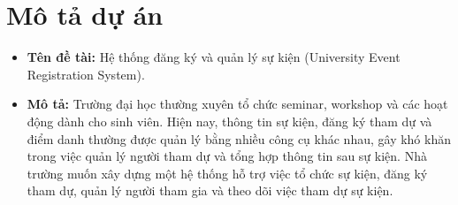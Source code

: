 \section*{Mô tả dự án}

\begin{itemize}
    \item \textbf{Tên đề tài:} Hệ thống đăng ký và quản lý sự kiện (University Event Registration System).
    \item \textbf{Mô tả:} Trường đại học thường xuyên tổ chức seminar, workshop và các hoạt động dành cho sinh viên. Hiện nay, thông tin sự kiện, đăng ký tham dự và điểm danh thường được quản lý bằng nhiều công cụ khác nhau, gây khó khăn trong việc quản lý người tham dự và tổng hợp thông tin sau sự kiện. Nhà trường muốn xây dựng một hệ thống hỗ trợ việc tổ chức sự kiện, đăng ký tham dự, quản lý người tham gia và theo dõi việc tham dự sự kiện.
\end{itemize}
